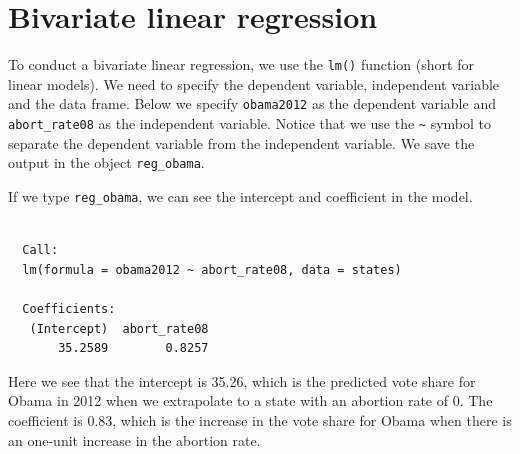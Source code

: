 \documentclass[12pt,oneside]{reedthesis}
\theoremstyle{definition}
\theoremstyle{definition}
\theoremstyle{definition}
\theoremstyle{remark}
\begin{document}
  \section{Bivariate linear regression}\label{bivariate-linear-regression}
  
  To conduct a bivariate linear regression, we use the \texttt{lm()}
  function (short for linear models). We need to specify the dependent
  variable, independent variable and the data frame. Below we specify
  \texttt{obama2012} as the dependent variable and \texttt{abort\_rate08}
  as the independent variable. Notice that we use the
  \texttt{\textasciitilde{}} symbol to separate the dependent variable
  from the independent variable. We save the output in the object
  \texttt{reg\_obama}.
  \begin{Shaded}
  \begin{Highlighting}[]
  \StringTok{ }\OperatorTok{~}\StringTok{ }
  \end{Highlighting}
  \end{Shaded}
  If we type \texttt{reg\_obama}, we can see the intercept and coefficient
  in the model.
  \begin{Shaded}
  \begin{Highlighting}[]
  \end{Highlighting}
  \end{Shaded}
  \begin{verbatim}
  
  Call:
  lm(formula = obama2012 ~ abort_rate08, data = states)
  
  Coefficients:
   (Intercept)  abort_rate08  
       35.2589        0.8257  
  \end{verbatim}
  Here we see that the intercept is 35.26, which is the predicted vote
  share for Obama in 2012 when we extrapolate to a state with an abortion
  rate of 0. The coefficient is 0.83, which is the increase in the vote
  share for Obama when there is an one-unit increase in the abortion rate.
  
\end{document}
